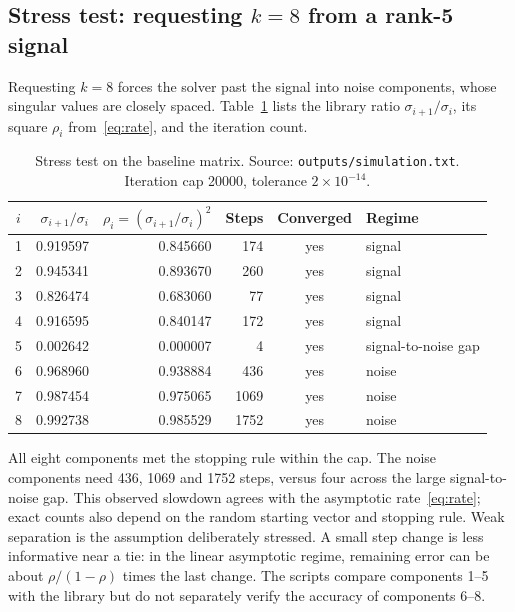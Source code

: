 \documentclass[11pt,letterpaper]{article}
\numberwithin{equation}{section}
\begin{document}
\subsection{Stress test: requesting \texorpdfstring{$k=8$}{k=8} from a rank-5 signal}\label{sec:stress}
Requesting $k=8$ forces the solver past the signal into noise components, whose singular values are closely spaced. Table~\ref{tab:stress} lists the library ratio $\sigma_{i+1}/\sigma_i$, its square $\rho_i$ from~\eqref{eq:rate}, and the iteration count.

\begin{table}[H]
\centering\small
\caption{Stress test on the baseline matrix. Source: \texttt{outputs/simulation.txt}. Iteration cap 20000, tolerance $2\times10^{-14}$.}
\label{tab:stress}
\begin{tabular}{@{}c rrrc l@{}}\toprule
$i$ & $\sigma_{i+1}/\sigma_i$ & $\rho_i=(\sigma_{i+1}/\sigma_i)^2$ & Steps & Converged & Regime\\\midrule
1 & 0.919597 & 0.845660 & 174 & yes & signal\\
2 & 0.945341 & 0.893670 & 260 & yes & signal\\
3 & 0.826474 & 0.683060 & 77 & yes & signal\\
4 & 0.916595 & 0.840147 & 172 & yes & signal\\
5 & 0.002642 & 0.000007 & 4 & yes & signal-to-noise gap\\
6 & 0.968960 & 0.938884 & 436 & yes & noise\\
7 & 0.987454 & 0.975065 & 1069 & yes & noise\\
8 & 0.992738 & 0.985529 & 1752 & yes & noise\\\bottomrule
\end{tabular}
\end{table}

All eight components met the stopping rule within the cap. The noise components need 436, 1069 and 1752 steps, versus four across the large signal-to-noise gap. This observed slowdown agrees with the asymptotic rate~\eqref{eq:rate}; exact counts also depend on the random starting vector and stopping rule. Weak separation is the assumption deliberately stressed. A small step change is less informative near a tie: in the linear asymptotic regime, remaining error can be about $\rho/(1-\rho)$ times the last change. The scripts compare components 1--5 with the library but do not separately verify the accuracy of components 6--8.

\end{document}
